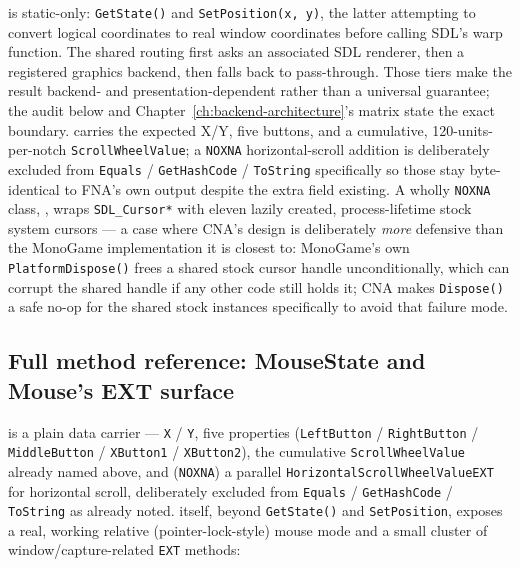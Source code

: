  is static-only: \texttt{GetState()} and \texttt{SetPosition(x, y)}, the
latter attempting to convert logical coordinates to real window coordinates before calling
SDL's warp function. The shared routing first asks an associated SDL renderer, then a
registered graphics backend, then falls back to pass-through. Those tiers make the result
backend- and presentation-dependent rather than a universal guarantee; the audit below and
Chapter~\ref{ch:backend-architecture}'s matrix state the exact boundary.
 carries the expected X/Y, five buttons, and a cumulative,
120-units-per-notch \texttt{ScrollWheelValue}; a \texttt{NOXNA} horizontal-scroll addition is
deliberately excluded from \texttt{Equals} / \texttt{GetHashCode} / \texttt{ToString} specifically
so those stay byte-identical to FNA's own output despite the extra field existing. A wholly
\texttt{NOXNA} class, , wraps \texttt{SDL\_Cursor*} with eleven lazily
created, process-lifetime stock system cursors --- a case where CNA's design is deliberately
\emph{more} defensive than the MonoGame implementation it is closest to: MonoGame's own
\texttt{PlatformDispose()} frees a shared stock cursor handle unconditionally, which can
corrupt the shared handle if any other code still holds it; CNA makes \texttt{Dispose()} a
safe no-op for the shared stock instances specifically to avoid that failure mode.

\subsection{Full method reference: MouseState and Mouse's EXT surface}

 is a plain data carrier --- \texttt{X} / \texttt{Y}, five
 properties (\texttt{LeftButton} / \texttt{RightButton} /
\texttt{MiddleButton} / \texttt{XButton1} / \texttt{XButton2}), the cumulative
\texttt{ScrollWheelValue} already named above, and (\texttt{NOXNA}) a parallel
\texttt{HorizontalScrollWheelValueEXT} for horizontal scroll, deliberately excluded from
\texttt{Equals} / \texttt{GetHashCode} / \texttt{ToString} as already noted. 
itself, beyond \texttt{GetState()} and \texttt{SetPosition}, exposes a real, working relative
(pointer-lock-style) mouse mode and a small cluster of window/capture-related \texttt{EXT}
methods:

